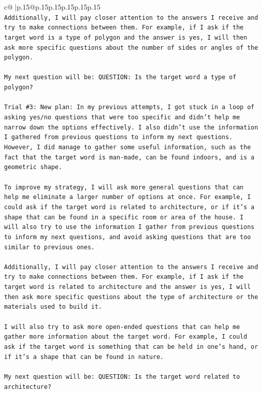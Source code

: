 \documentclass{article}
\begin{document}
{\begin{supertabular}{c@{$\;$}|p{.15\linewidth}@{}p{.15\linewidth}p{.15\linewidth}p{.15\linewidth}p{.15\linewidth}p{.15\linewidth}}
{{{\\ 
\texttt{Additionally, I will pay closer attention to the answers I receive and try to make connections between them. For example, if I ask if the target word is a type of polygon and the answer is yes, I will then ask more specific questions about the number of sides or angles of the polygon. } \\
\\ 
\texttt{My next question will be: QUESTION: Is the target word a type of polygon?} \\
\\ 
\texttt{Trial \#3: New plan: In my previous attempts, I got stuck in a loop of asking yes/no questions that were too specific and didn't help me narrow down the options effectively. I also didn't use the information I gathered from previous questions to inform my next questions. However, I did manage to gather some useful information, such as the fact that the target word is man{-}made, can be found indoors, and is a geometric shape.} \\
\\ 
\texttt{To improve my strategy, I will ask more general questions that can help me eliminate a larger number of options at once. For example, I could ask if the target word is related to architecture, or if it's a shape that can be found in a specific room or area of the house. I will also try to use the information I gather from previous questions to inform my next questions, and avoid asking questions that are too similar to previous ones.} \\
\\ 
\texttt{Additionally, I will pay closer attention to the answers I receive and try to make connections between them. For example, if I ask if the target word is related to architecture and the answer is yes, I will then ask more specific questions about the type of architecture or the materials used to build it.} \\
\\ 
\texttt{I will also try to ask more open{-}ended questions that can help me gather more information about the target word. For example, I could ask if the target word is something that can be held in one's hand, or if it's a shape that can be found in nature.} \\
\\ 
\texttt{My next question will be: QUESTION: Is the target word related to architecture?} \\
\\ 
\\ 
}}}
\end{supertabular}}
\end{document}
